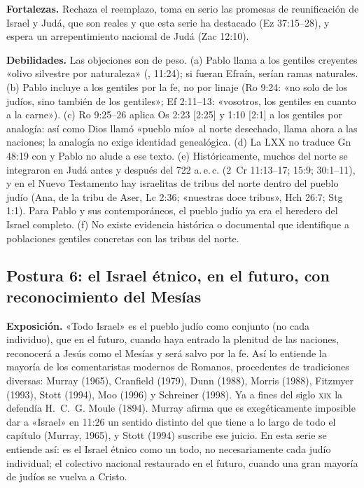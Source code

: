 \textbf{Fortalezas.} Rechaza el reemplazo, toma en serio las promesas de reunificación de Israel y Judá, que son reales y que esta serie ha destacado (Ez 37:15--28), y espera un arrepentimiento nacional de Judá (Zac 12:10).

\textbf{Debilidades.} Las objeciones son de peso. (a) Pablo llama a los gentiles creyentes «olivo silvestre por naturaleza» (, 11:24); si fueran Efraín, serían ramas naturales. (b) Pablo incluye a los gentiles por la fe, no por linaje (Ro 9:24: «no solo de los judíos, sino también de los gentiles»; Ef 2:11--13: «vosotros, los gentiles en cuanto a la carne»). (c) Ro 9:25--26 aplica Os 2:23 [2:25] y 1:10 [2:1] a los gentiles por analogía: así como Dios llamó «pueblo mío» al norte desechado, llama ahora a las naciones; la analogía no exige identidad genealógica. (d) La LXX no traduce Gn 48:19 con  y Pablo no alude a ese texto. (e) Históricamente, muchos del norte se integraron en Judá antes y después del 722 a.\,e.\,c. (2~Cr 11:13--17; 15:9; 30:1--11), y en el Nuevo Testamento hay israelitas de tribus del norte dentro del pueblo judío (Ana, de la tribu de Aser, Lc 2:36; «nuestras doce tribus», Hch 26:7; Stg 1:1). Para Pablo y sus contemporáneos, el pueblo judío ya era el heredero del Israel completo. (f) No existe evidencia histórica o documental que identifique a poblaciones gentiles concretas con las tribus del norte.

\subsection{Postura 6: el Israel étnico, en el futuro, con reconocimiento del Mesías}
\textbf{Exposición.} «Todo Israel» es el pueblo judío como conjunto (no cada individuo), que en el futuro, cuando haya entrado la plenitud de las naciones, reconocerá a Jesús como el Mesías y será salvo por la fe. Así lo entiende la mayoría de los comentaristas modernos de Romanos, procedentes de tradiciones diversas: Murray (1965), Cranfield (1979), Dunn (1988), Morris (1988), Fitzmyer (1993), Stott (1994), Moo (1996) y Schreiner (1998). Ya a fines del siglo \textsc{xix} la defendía H.~C.~G. Moule (1894). Murray afirma que es exegéticamente imposible dar a «Israel» en 11:26 un sentido distinto del que tiene a lo largo de todo el capítulo (Murray, 1965), y Stott (1994) suscribe ese juicio. En esta serie se entiende así: es el Israel étnico como un todo, no necesariamente cada judío individual; el colectivo nacional restaurado en el futuro, cuando una gran mayoría de judíos se vuelva a Cristo.

